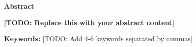 \begin{flushright}
  \huge{\textbf{Abstract}}
\end{flushright}

\vspace{0.5cm}

%
%

\textbf{[TODO: Replace this with your abstract content]}

\vspace{1cm}

\noindent\textbf{Keywords:} [TODO: Add 4-6 keywords separated by commas]